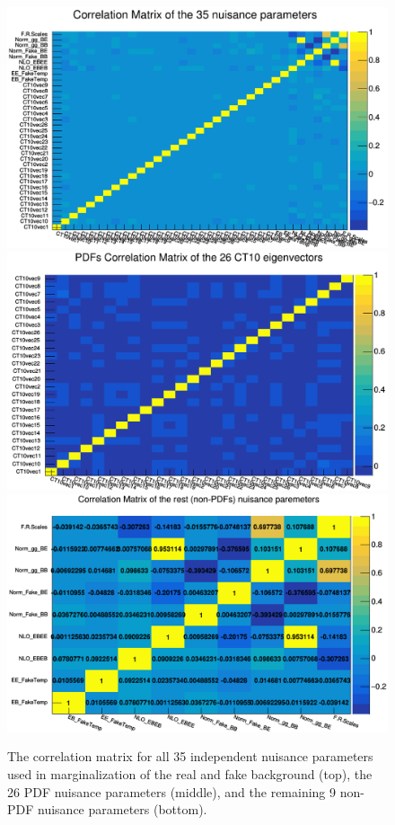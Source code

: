 \begin{figure}[!htbp]
	\centering
	\includegraphics[scale=0.34]{figures/corr35.png}
	\includegraphics[scale=0.34]{figures/corr26.png}
	\includegraphics[scale=0.34]{figures/corr9.png}
	\caption{The correlation matrix for all 35 independent nuisance parameters used in marginalization of the real and fake background (top), the 26 PDF nuisance parameters (middle), and the remaining 9 non-PDF nuisance parameters (bottom).}
	\label{Fig:corr}
\end{figure}


